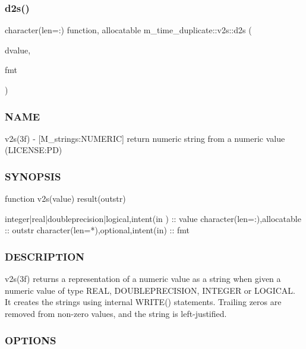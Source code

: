 \subsubsection{\texorpdfstring{d2s()}{d2s()}}
{\footnotesize\ttfamily character(len=\+:) function, allocatable m\+\_\+time\+\_\+duplicate\+::v2s\+::d2s (\begin{DoxyParamCaption}\item[{doubleprecision, intent(in)}]{dvalue,  }\item[{character(len=$\ast$), intent(in), optional}]{fmt }\end{DoxyParamCaption})}



\subsubsection*{N\+A\+ME}

v2s(3f) -\/ \mbox{[}M\+\_\+strings\+:N\+U\+M\+E\+R\+IC\mbox{]} return numeric string from a numeric value (L\+I\+C\+E\+N\+SE\+:PD) 

\subsubsection*{S\+Y\+N\+O\+P\+S\+IS}

\begin{DoxyVerb}   function v2s(value) result(outstr)

    integer|real|doubleprecision|logical,intent(in ) :: value
    character(len=:),allocatable :: outstr
    character(len=*),optional,intent(in) :: fmt
\end{DoxyVerb}


\subsubsection*{D\+E\+S\+C\+R\+I\+P\+T\+I\+ON}

v2s(3f) returns a representation of a numeric value as a string when given a numeric value of type R\+E\+AL, D\+O\+U\+B\+L\+E\+P\+R\+E\+C\+I\+S\+I\+ON, I\+N\+T\+E\+G\+ER or L\+O\+G\+I\+C\+AL. It creates the strings using internal W\+R\+I\+T\+E() statements. Trailing zeros are removed from non-\/zero values, and the string is left-\/justified.

\subsubsection*{O\+P\+T\+I\+O\+NS}

